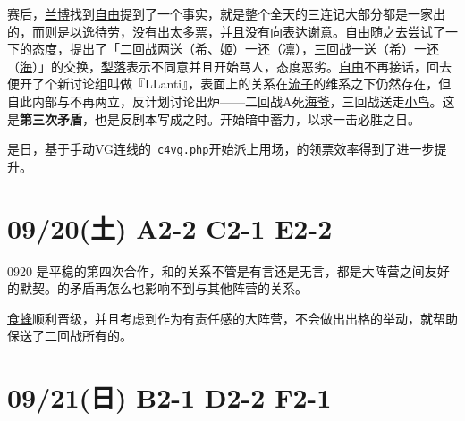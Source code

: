赛后，\uline{兰博}找到\uline{自由}提到了一个事实，就是整个全天的三连记大部分都是一家出的，而则是以逸待劳，没有出太多票，并且没有向表达谢意。\uline{自由}随之去尝试了一下的态度，提出了「二回战两送（\uline{希}、\uline{姬}）一还（\uline{凛}），三回战一送（\uline{希}）一还（\uline{海}）」的交换，\uline{梨落}表示不同意并且开始骂人，态度恶劣。\uline{自由}不再接话，回去便开了个新讨论组叫做『LLanti』，表面上的关系在\uline{流子}的维系之下仍然存在，但自此内部与不再两立，反计划讨论出炉——二回战A死\uline{海爷}，三回战送走\uline{小鸟}。这是\textbf{第三次矛盾}，也是反剧本写成之时。开始暗中蓄力，以求一击必胜之日。

是日，基于手动VG连线的~\verb=c4vg.php=开始派上用场，的领票效率得到了进一步提升。

\section{09/20(土) A2-2 C2-1 E2-2}


0920 是平稳的第四次合作，和的关系不管是有言还是无言，都是大阵营之间友好的默契。的矛盾再怎么也影响不到与其他阵营的关系。

\uline{食蜂}顺利晋级，并且考虑到作为有责任感的大阵营，不会做出出格的举动，就帮助保送了二回战所有的。

\section{09/21(日) B2-1 D2-2 F2-1}


